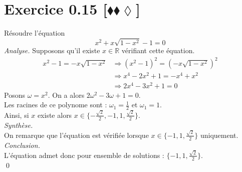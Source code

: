 \documentclass[10pt]{article}
\begin{document}
\section*{Exercice 0.15 [$\blacklozenge\blacklozenge\lozenge$]}
\begin{tcolorbox}[enhanced, width=7in, center, size=fbox, fontupper=\large, drop shadow southwest]
    Résoudre l'équation
    \begin{equation*}
        x^2 + x\sqrt{1-x^2}-1=0
    \end{equation*}
    \emph{Analyse.}
    Supposons qu'il existe $x\in\mathbb{R}$ vérifiant cette équation.
    \begin{align*}
        x^2-1=-x\sqrt{1-x^2} 
        &\Rightarrow (x^2-1)^2=(-x\sqrt{1-x^2})^2\\
        &\Rightarrow x^4 - 2x^2 + 1 = -x^4+x^2\\
        &\Rightarrow 2x^4-3x^2+1=0
    \end{align*}
    Posons $\omega=x^2$. On a alors $2\omega^2-3\omega+1=0$.\\
    Les racines de ce polynome sont : $\omega_1=\frac{1}{2}$ et $\omega_1=1$.\\
    Ainsi, si $x$ existe alors $x\in\{-\frac{\sqrt{2}}{2},-1,1,\frac{\sqrt{2}}{2}\}$.\\[0.25cm]
    \emph{Synthèse.}\\
    On remarque que l'équation est vérifiée lorsque $x\in\{-1,1,\frac{\sqrt{2}}{2}\}$ uniquement.\\[0.25cm]
    \emph{Conclusion.}\\
    L'équation admet donc pour ensemble de solutions : $\{-1,1,\frac{\sqrt{2}}{2}\}$.\\
    \qed
\end{tcolorbox}
\end{document}
